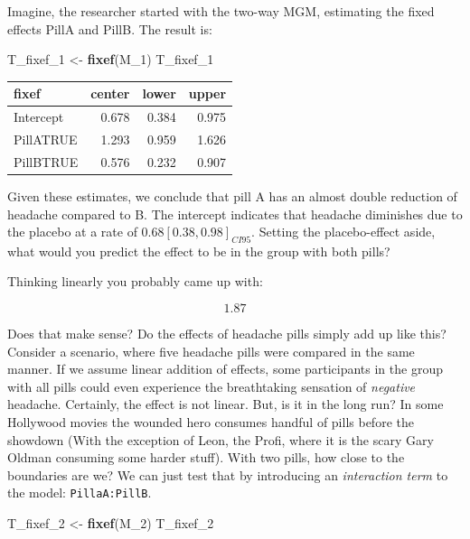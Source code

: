 \documentclass[]{svmono}
\newenvironment{Shaded}{\begin{snugshade}}{\end{snugshade}}
\newcommand{\KeywordTok}[1]{\textcolor[rgb]{0.13,0.29,0.53}{\textbf{#1}}}
\newcommand{\DecValTok}[1]{\textcolor[rgb]{0.00,0.00,0.81}{#1}}
\newcommand{\StringTok}[1]{\textcolor[rgb]{0.31,0.60,0.02}{#1}}
\newcommand{\NormalTok}[1]{#1}
\begin{document}
Imagine, the researcher started with the two-way MGM, estimating the
fixed effects PillA and PillB. The result is:

\begin{Shaded}
\begin{Highlighting}[]
\NormalTok{T_fixef_}\DecValTok{1}\NormalTok{ <-}\StringTok{ }\KeywordTok{fixef}\NormalTok{(M_}\DecValTok{1}\NormalTok{)}
\NormalTok{T_fixef_}\DecValTok{1}
\end{Highlighting}
\end{Shaded}

\begin{longtable}[]{@{}lrrr@{}}
\toprule
fixef & center & lower & upper\tabularnewline
\midrule
\endhead
Intercept & 0.678 & 0.384 & 0.975\tabularnewline
PillATRUE & 1.293 & 0.959 & 1.626\tabularnewline
PillBTRUE & 0.576 & 0.232 & 0.907\tabularnewline
\bottomrule
\end{longtable}

Given these estimates, we conclude that pill A has an almost double
reduction of headache compared to B. The intercept indicates that
headache diminishes due to the placebo at a rate of
\(0.68 [0.38, 0.98]_{CI95}\). Setting the placebo-effect aside, what
would you predict the effect to be in the group with both pills?

Thinking linearly you probably came up with:

\[1.87\]

Does that make sense? Do the effects of headache pills simply add up
like this? Consider a scenario, where five headache pills were compared
in the same manner. If we assume linear addition of effects, some
participants in the group with all pills could even experience the
breathtaking sensation of \emph{negative} headache. Certainly, the
effect is not linear. But, is it in the long run? In some Hollywood
movies the wounded hero consumes handful of pills before the showdown
(With the exception of Leon, the Profi, where it is the scary Gary
Oldman consuming some harder stuff). With two pills, how close to the
boundaries are we? We can just test that by introducing an
\emph{interaction term} to the model: \texttt{PillaA:PillB}.

\begin{Shaded}
\begin{Highlighting}[]
\NormalTok{T_fixef_}\DecValTok{2}\NormalTok{ <-}\StringTok{  }\KeywordTok{fixef}\NormalTok{(M_}\DecValTok{2}\NormalTok{)}
\NormalTok{T_fixef_}\DecValTok{2}
\end{Highlighting}
\end{Shaded}
\end{document}
